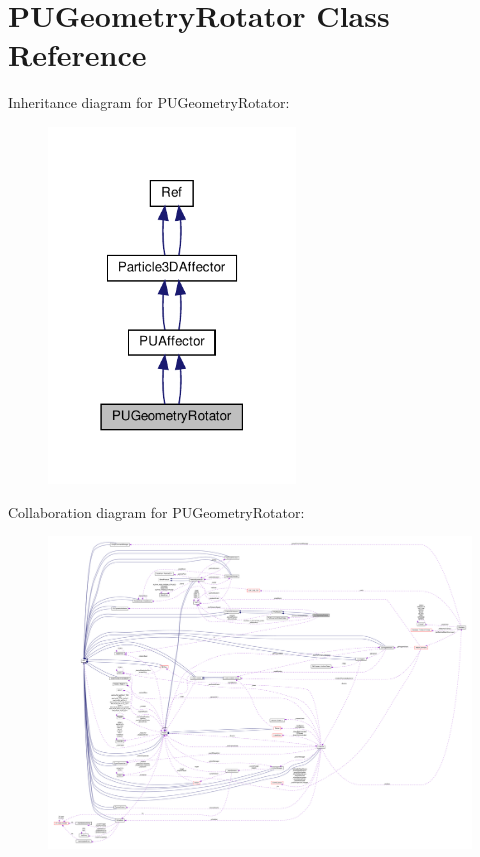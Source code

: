 \hypertarget{classPUGeometryRotator}{}\section{P\+U\+Geometry\+Rotator Class Reference}
\label{classPUGeometryRotator}


Inheritance diagram for P\+U\+Geometry\+Rotator\+:
\nopagebreak
\begin{figure}[H]
\begin{center}
\leavevmode
\includegraphics[width=186pt]{classPUGeometryRotator__inherit__graph}
\end{center}
\end{figure}


Collaboration diagram for P\+U\+Geometry\+Rotator\+:
\nopagebreak
\begin{figure}[H]
\begin{center}
\leavevmode
\includegraphics[width=350pt]{classPUGeometryRotator__coll__graph}
\end{center}
\end{figure}
